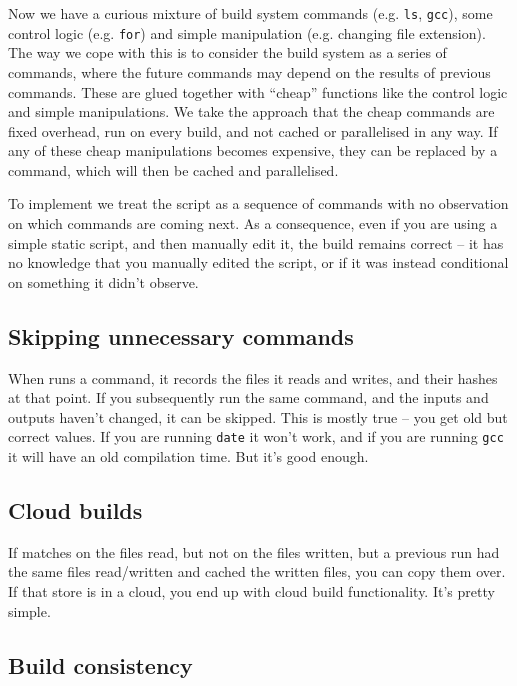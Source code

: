 Now we have a curious mixture of build system commands (e.g. \texttt{ls}, \texttt{gcc}), some control logic (e.g. \texttt{for}) and simple manipulation (e.g. changing file extension). The way we cope with this is to consider the build system as a series of commands, where the future commands may depend on the results of previous commands. These are glued together with ``cheap'' functions like the control logic and simple manipulations. We take the approach that the cheap commands are fixed overhead, run on every build, and not cached or parallelised in any way. If any of these cheap manipulations becomes expensive, they can be replaced by a command, which will then be cached and parallelised.

To implement \Rattle we treat the script as a sequence of commands with no observation on which commands are coming next. As a consequence, even if you are using a simple static script, and then manually edit it, the \Rattle build remains correct -- it has no knowledge that you manually edited the script, or if it was instead conditional on something it didn't observe.

\subsection{Skipping unnecessary commands}

When \Rattle runs a command, it records the files it reads and writes, and their hashes at that point. If you subsequently run the same command, and the inputs and outputs haven't changed, it can be skipped. This is mostly true -- you get old but correct values. If you are running \texttt{date} it won't work, and if you are running \texttt{gcc} it will have an old compilation time. But it's good enough.

\subsection{Cloud builds}

If \Rattle matches on the files read, but not on the files written, but a previous run had the same files read/written and cached the written files, you can copy them over. If that store is in a cloud, you end up with cloud build functionality. It's pretty simple.

\subsection{Build consistency}

